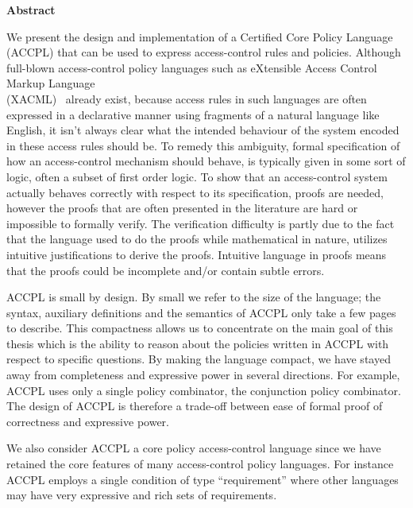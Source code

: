 
\begin{center}\textbf{Abstract}\end{center}

We present the design and implementation of a Certified Core Policy Language (ACCPL) that can be used to express access-control rules and policies. Although full-blown access-control policy languages such as eXtensible Access Control Markup Language \\(XACML)~\cite{xacml} already exist, because access rules in such languages are often expressed in a declarative manner using fragments of a natural language like English, it isn't always clear what the intended behaviour of the system encoded in these access rules should be. To remedy this ambiguity, formal specification of how an access-control mechanism should behave, is typically given in some sort of logic, often a subset of first order logic. To show that an access-control system actually behaves correctly with respect to its specification, proofs are needed, however the proofs that are often presented in the literature are hard or impossible to formally verify. The verification difficulty is partly due to the fact that the language used to do the proofs while mathematical in nature, utilizes intuitive justifications to derive the proofs. Intuitive language in proofs means that the proofs could be incomplete and/or contain subtle errors.

ACCPL is small by design. By small we refer to the size of the language; the syntax, auxiliary definitions and the semantics of ACCPL only take a few pages to describe. This compactness allows us to concentrate on the main goal of this thesis which is the ability to reason about the policies written in ACCPL with respect to specific questions. By making the language compact, we have stayed away from completeness and expressive power in several directions. For example, ACCPL uses only a single policy combinator, the conjunction policy combinator. The design of ACCPL is therefore a trade-off between ease of formal proof of correctness and expressive power.

We also consider ACCPL a core policy access-control language since we have retained the core features of many access-control policy languages. For instance ACCPL employs a single condition of type ``requirement'' where other languages may have very expressive and rich sets of requirements. 


\cleardoublepage

